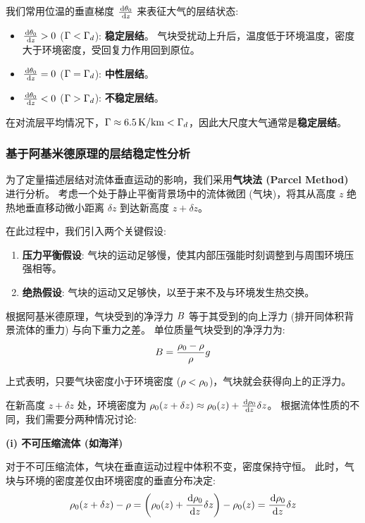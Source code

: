 我们常用位温的垂直梯度 $\ode{\ptemp_0}{z}$ 来表征大气的层结状态:
\begin{itemize}
    \item $\ode{\ptemp_0}{z} > 0$ ($\Gamma < \Gamma_d$): \textbf{稳定层结}。
    气块受扰动上升后，温度低于环境温度，密度大于环境密度，受回复力作用回到原位。
    \item $\ode{\ptemp_0}{z} = 0$ ($\Gamma = \Gamma_d$): \textbf{中性层结}。
    \item $\ode{\ptemp_0}{z} < 0$ ($\Gamma > \Gamma_d$): \textbf{不稳定层结}。
\end{itemize}

在对流层平均情况下，$\Gamma \approx 6.5\,\mathrm{K/km} < \Gamma_d$，因此大尺度大气通常是\textbf{稳定层结}。

\subsubsection{基于阿基米德原理的层结稳定性分析}

为了定量描述层结对流体垂直运动的影响，我们采用\textbf{气块法 (Parcel Method)} 进行分析。
考虑一个处于静止平衡背景场中的流体微团 (气块)，将其从高度 $z$ 绝热地垂直移动微小距离 $\delta z$ 到达新高度 $z + \delta z$。

在此过程中，我们引入两个关键假设:
\begin{enumerate}
    \item \textbf{压力平衡假设}: 气块的运动足够慢，使其内部压强能时刻调整到与周围环境压强相等。
    \item \textbf{绝热假设}: 气块的运动又足够快，以至于来不及与环境发生热交换。
\end{enumerate}

根据阿基米德原理，气块受到的净浮力 $B$ 等于其受到的向上浮力 (排开同体积背景流体的重力) 与向下重力之差。
单位质量气块受到的净浮力为:
\begin{equation}
    B = \frac{\rho_0 - \rho}{\rho} g
    \label{eq:buoyancy}
\end{equation}

上式表明，只要气块密度小于环境密度 ($\rho < \rho_0$)，气块就会获得向上的正浮力。


在新高度 $z+\delta z$ 处，环境密度为 $\density_0(z + \delta z) \approx \density_0(z) + \ode{\density_0}{z} \delta z$。
根据流体性质的不同，我们需要分两种情况讨论:

\textbf{(i) 不可压缩流体 (如海洋)}

对于不可压缩流体，气块在垂直运动过程中体积不变，密度保持守恒。
此时，气块与环境的密度差仅由环境密度的垂直分布决定:
\begin{equation*}
    \density_0(z+\delta z) - \density = \left( \density_0(z) + \ode{\density_0}{z} \delta z \right) - \density_0(z) = \ode{\density_0}{z} \delta z
\end{equation*}

